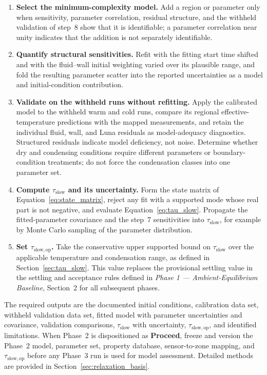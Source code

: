 \documentclass[11pt]{article}
\newcommand{\PhaseOneDoc}{\textit{Phase 1 --- Ambient-Equilibrium Baseline}}
\begin{document}
\begin{enumerate}
    \item \textbf{Select the minimum-complexity model.} Add a region or parameter only when sensitivity, parameter correlation, residual structure, and the withheld validation of step~8 show that it is identifiable; a parameter correlation near unity indicates that the addition is not separately identifiable.

    \item \textbf{Quantify structural sensitivities.} Refit with the fitting start time shifted and with the fluid--wall initial weighting varied over its plausible range, and fold the resulting parameter scatter into the reported uncertainties as a model and initial-condition contribution.

    \item \textbf{Validate on the withheld runs without refitting.} Apply the calibrated model to the withheld warm and cold runs, compare its regional effective-temperature predictions with the mapped measurements, and retain the individual fluid, wall, and Luna residuals as model-adequacy diagnostics. Structured residuals indicate model deficiency, not noise. Determine whether dry and condensing conditions require different parameters or boundary-condition treatments; do not force the condensation classes into one parameter set.

    \item \textbf{Compute $\tau_{\mathrm{slow}}$ and its uncertainty.} Form the state matrix of Equation~\eqref{eq:state_matrix}, reject any fit with a supported mode whose real part is not negative, and evaluate Equation~\eqref{eq:tau_slow}. Propagate the fitted-parameter covariance and the step~7 sensitivities into $\tau_{\mathrm{slow}}$, for example by Monte Carlo sampling of the parameter distribution.

    \item \textbf{Set $\tau_{\mathrm{slow,op}}$.} Take the conservative upper supported bound on $\tau_{\mathrm{slow}}$ over the applicable temperature and condensation range, as defined in Section~\ref{sec:tau_slow}. This value replaces the provisional settling value in the settling and acceptance rules defined in \PhaseOneDoc, Section~2 for all subsequent phases.
\end{enumerate}

The required outputs are the documented initial conditions, calibration data set, withheld validation data set, fitted model with parameter uncertainties and covariance, validation comparisons, $\tau_{\mathrm{slow}}$ with uncertainty, $\tau_{\mathrm{slow,op}}$, and identified limitations. When Phase~2 is dispositioned as \textbf{Proceed}, freeze and version the Phase~2 model, parameter set, property database, sensor-to-zone mapping, and $\tau_{\mathrm{slow,op}}$ before any Phase~3 run is used for model assessment. Detailed methods are provided in Section~\ref{sec:relaxation_basis}.
\end{document}
